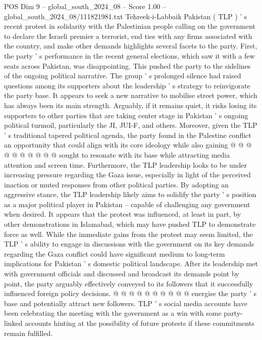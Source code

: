 \begin{textsample}{POS Dim 9 – global\_south\_2024\_08 – Score 1.00 – global\_south\_2024\_08/111821981.txt}  \label{ex:f9_pos_063}
Tehreek-i-Labbaik Pakistan ( TLP ) ' s recent protest in solidarity with the Palestinian people calling on the government to declare the Israeli premier a terrorist, end ties with any firms associated with the country, and make other demands highlights several facets to the party.
First, the party ' s performance in the recent general elections, which saw it with a few seats across Pakistan, was disappointing.
This pushed the party to the sidelines of the ongoing political narrative.
The group ' s prolonged silence had raised questions among its supporters about the leadership ' s strategy to reinvigorate the party base.
It appears to seek a new narrative to mobilise street power, which has always been its main strength.
Arguably, if it remains quiet, it risks losing its supporters to other parties that are taking center stage in Pakistan ' s ongoing political turmoil, particularly the JI, JUI-F, and others.
Moreover, given the TLP ' s traditional tapered political agenda, the party found in the Palestine conflict an opportunity that could align with its core ideology while also gaining @ @ @ @ @ @ @ @ @ @ sought to resonate with its base while attracting media attention and screen time.
Furthermore, the TLP leadership looks to be under increasing pressure regarding the Gaza issue, especially in light of the perceived inaction or muted responses from other political parties.
By adopting an aggressive stance, the TLP leadership likely aims to solidify the party ' s position as a major political player in Pakistan -- capable of challenging any government when desired.
It appears that the protest was influenced, at least in part, by other demonstrations in Islamabad, which may have pushed TLP to demonstrate force as well.
While the immediate gains from the protest may seem limited, the TLP ' s ability to engage in discussions with the government on its key demands regarding the Gaza conflict could have significant medium to long-term implications for Pakistan ' s domestic political landscape.
After its leadership met with government officials and discussed and broadcast its demands point by point, the party arguably effectively conveyed to its followers that it successfully influenced foreign policy decisions. @ @ @ @ @ @ @ @ @ @ energise the party ' s base and potentially attract new followers.
TLP ' s social media accounts have been celebrating the meeting with the government as a win with some party-linked accounts hinting at the possibility of future protests if these commitments remain fulfilled.

\end{textsample}
